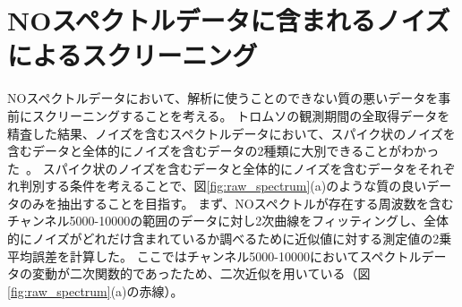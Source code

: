 \section{NOスペクトルデータに含まれるノイズによるスクリーニング}
\label{sec:screening_spectralnoise}
NOスペクトルデータにおいて、解析に使うことのできない質の悪いデータを事前にスクリーニングすることを考える。
トロムソの観測期間の全取得データを精査した結果、ノイズを含むスペクトルデータにおいて、スパイク状のノイズを含むデータと全体的にノイズを含むデータの2種類に大別できることがわかった~\cite{goto2021bachelor}。
スパイク状のノイズを含むデータと全体的にノイズを含むデータをそれぞれ判別する条件を考えることで、図\ref{fig:raw_spectrum}(a)のような質の良いデータのみを抽出することを目指す。
まず、NOスペクトルが存在する周波数を含むチャンネル5000-10000の範囲のデータに対し2次曲線をフィッティングし、全体的にノイズがどれだけ含まれているか調べるために近似値に対する測定値の2乗平均誤差を計算した。
ここではチャンネル5000-10000においてスペクトルデータの変動が二次関数的であったため、二次近似を用いている（図\ref{fig:raw_spectrum}(a)の赤線）。
